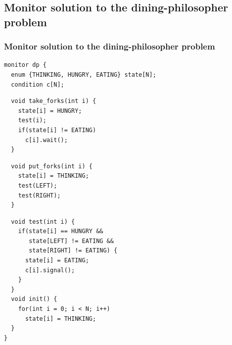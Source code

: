 \documentclass[CJKutf8,xcolor=pdftex,dvipsnames,table]{beamer}
\begin{document}
\begin{CJK*}{UTF8}{song}
  \subsection{Monitor solution to the dining-philosopher problem}

  \begin{frame}[fragile]
  \frametitle{Monitor solution to the dining-philosopher problem} \pause

\begin{lstlisting}
monitor dp {
  enum {THINKING, HUNGRY, EATING} state[N];
  condition c[N];
\end{lstlisting}

  \begin{minipage}[c]{0.5\textwidth}
\begin{lstlisting}
  void take_forks(int i) {
    state[i] = HUNGRY;
    test(i);
    if(state[i] != EATING)
      c[i].wait();
  }
\end{lstlisting}

  \end{minipage}%
  \begin{minipage}[c]{0.5\textwidth}

\begin{lstlisting}
  void put_forks(int i) {
    state[i] = THINKING;
    test(LEFT);
    test(RIGHT);
  }
\end{lstlisting}
  \end{minipage}

\begin{lstlisting}
  void test(int i) {
    if(state[i] == HUNGRY &&
       state[LEFT] != EATING &&
       state[RIGHT] != EATING) {
      state[i] = EATING;
      c[i].signal();
    }
  }
  void init() {
    for(int i = 0; i < N; i++)
      state[i] = THINKING;
  }
}
\end{lstlisting}

\end{frame}


\end{CJK*}
\end{document}
